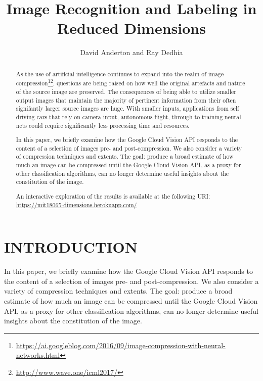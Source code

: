 \documentclass[letterpaper, 10 pt, conference]{ieeeconf}  %
\title{\LARGE \bf Image Recognition and Labeling in Reduced Dimensions}
\author{David Anderton and Ray Dedhia}
\begin{document}
\maketitle
\thispagestyle{empty}
\pagestyle{empty}



\begin{abstract}

\normalsize %

As the use of artificial intelligence continues to expand into the realm of image compression\footnote{\url{https://ai.googleblog.com/2016/09/image-compression-with-neural-networks.html}}\footnote{\url{http://www.wave.one/icml2017/}}, questions are being raised on how well the original artefacts and nature of the source image are preserved. The consequences of being able to utilize smaller output images that maintain the majority of pertinent information from their often signifantly larger source images are huge. With smaller inputs, applications from self driving cars that rely on camera input, autonomous flight, through to training neural nets could require significantly less processing time and resources.

In this paper, we briefly examine how the Google Cloud Vision API responds to the content of a selection of images pre- and post-compression. We also consider a variety of compression techniques and extents. The goal: produce a broad estimate of how much an image can be compressed until the Google Cloud Vision API, as a proxy for other classification algorithms, can no longer determine useful insights about the constitution of the image.

An interactive exploration of the results is available at the following URI: \url{https://mit18065-dimensions.herokuapp.com/}

\end{abstract}

\section{INTRODUCTION}

In this paper, we briefly examine how the Google Cloud Vision API responds to the content of a selection of images pre- and post-compression. We also consider a variety of compression techniques and extents. The goal: produce a broad estimate of how much an image can be compressed until the Google Cloud Vision API, as a proxy for other classification algorithms, can no longer determine useful insights about the constitution of the image.
\end{document}
